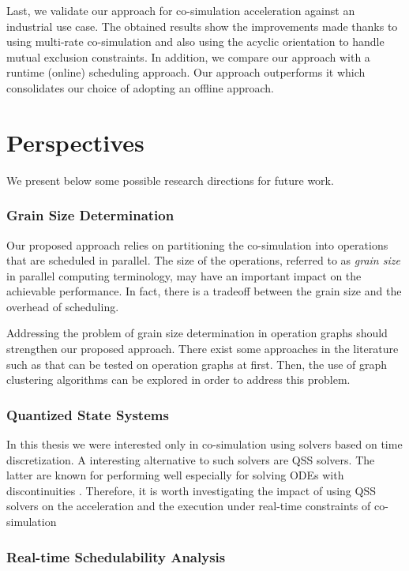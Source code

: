 Last, we validate our approach for co-simulation acceleration against an industrial use case. The obtained results show the improvements made thanks to using multi-rate co-simulation and also using the acyclic orientation to handle mutual exclusion constraints. In addition, we compare our approach with a runtime (online) scheduling approach. Our approach outperforms it which consolidates our choice of adopting an offline approach.               

\section{Perspectives}

We present below some possible research directions for future work.

\subsubsection{Grain Size Determination}

Our proposed approach relies on partitioning the co-simulation into operations that are scheduled in parallel. The size of the operations, referred to as \textit{grain size} in parallel computing terminology, may have an important impact on the achievable performance. In fact, there is a tradeoff between the grain size and the overhead of scheduling.

Addressing the problem of grain size determination in operation graphs should strengthen our proposed approach. There exist some approaches in the literature such as \cite{kruatrachue:1988} that can be tested on operation graphs at first. Then, the use of graph clustering algorithms can be explored in order to address this problem.

\subsubsection{Quantized State Systems}

In this thesis we were interested only in co-simulation using solvers based on time discretization. A interesting alternative to such solvers are QSS solvers. The latter are known for performing well especially for solving ODEs with discontinuities \cite{migoni:2012}. Therefore, it is worth investigating the impact of using QSS solvers on the acceleration and the execution under real-time constraints of co-simulation  

\subsubsection{Real-time Schedulability Analysis}

